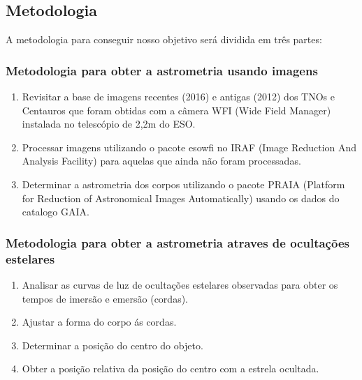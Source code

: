 \documentclass[a4paper, 11pt]{article}
\begin{document}
  
\subsection{Metodologia}

A metodologia para conseguir nosso objetivo será dividida em três partes:

\subsubsection{Metodologia para obter a astrometria usando imagens}
\begin{enumerate}
  \item Revisitar a base de imagens recentes (2016) e antigas (2012) dos TNOs e Centauros que foram obtidas com a câmera WFI (Wide Field Manager) instalada no telescópio de 2,2m do ESO.
  \item Processar imagens utilizando o pacote esowfi no IRAF (Image Reduction And Analysis Facility) para aquelas que ainda não foram processadas.
  \item Determinar a astrometria dos corpos utilizando o pacote PRAIA (Platform for Reduction of Astronomical Images Automatically) usando os dados do catalogo GAIA.
\end{enumerate}

\subsubsection{Metodologia para obter a astrometria atraves de ocultações estelares}
\begin{enumerate}
  \item Analisar as curvas de luz de ocultações estelares observadas para obter os tempos de imersão e emersão (cordas).
  \item Ajustar a forma do corpo ás cordas.
  \item Determinar a posição do centro do objeto.
  \item Obter a posição relativa da posição do centro com a estrela ocultada.
\end{enumerate}
\end{document}
